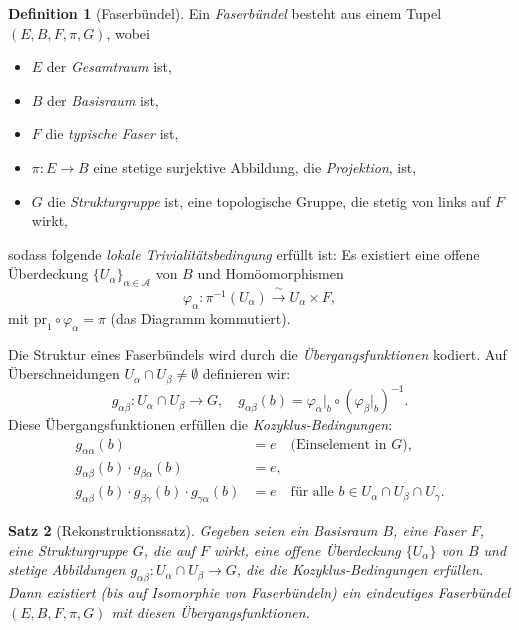 \documentclass[12pt,a4paper]{amsart}
\newtheorem{theorem}{Satz}[section]
\theoremstyle{definition}
\newtheorem{definition}[theorem]{Definition}
\begin{document}
\begin{definition}[Faserbündel]
Ein \emph{Faserbündel} besteht aus einem Tupel $(E, B, F, \pi, G)$, wobei
\begin{itemize}[noitemsep]
  \item $E$ der \emph{Gesamtraum} ist,
  \item $B$ der \emph{Basisraum} ist,
  \item $F$ die \emph{typische Faser} ist,
  \item $\pi \colon E \to B$ eine stetige surjektive Abbildung, die
        \emph{Projektion}, ist,
  \item $G$ die \emph{Strukturgruppe} ist, eine topologische Gruppe, die
        stetig von links auf $F$ wirkt,
\end{itemize}
sodass folgende \emph{lokale Trivialitätsbedingung} erfüllt ist: Es existiert
eine offene Überdeckung $\{U_\alpha\}_{\alpha \in \mathcal{A}}$ von $B$ und
Homöomorphismen
\[
  \varphi_\alpha \colon \pi^{-1}(U_\alpha) \xrightarrow{\;\sim\;} U_\alpha \times F,
\]
mit $\mathrm{pr}_1 \circ \varphi_\alpha = \pi$ (das Diagramm kommutiert).
\end{definition}

Die Struktur eines Faserbündels wird durch die \emph{Übergangsfunktionen} kodiert.
Auf Überschneidungen $U_\alpha \cap U_\beta \neq \emptyset$ definieren wir:
\[
  g_{\alpha\beta} \colon U_\alpha \cap U_\beta \to G, \quad
  g_{\alpha\beta}(b) = \varphi_\alpha|_b \circ (\varphi_\beta|_b)^{-1}.
\]
Diese Übergangsfunktionen erfüllen die \emph{Kozyklus-Bedingungen}:
\begin{align*}
  g_{\alpha\alpha}(b) &= e \quad \text{(Einselement in } G\text{)},\\
  g_{\alpha\beta}(b) \cdot g_{\beta\alpha}(b) &= e,\\
  g_{\alpha\beta}(b) \cdot g_{\beta\gamma}(b) \cdot g_{\gamma\alpha}(b) &= e
  \quad \text{für alle } b \in U_\alpha \cap U_\beta \cap U_\gamma.
\end{align*}

\begin{theorem}[Rekonstruktionssatz]
\label{thm:rekonstruktion}
Gegeben seien ein Basisraum $B$, eine Faser $F$, eine Strukturgruppe $G$, die
auf $F$ wirkt, eine offene Überdeckung $\{U_\alpha\}$ von $B$ und stetige
Abbildungen $g_{\alpha\beta} \colon U_\alpha \cap U_\beta \to G$, die die
Kozyklus-Bedingungen erfüllen. Dann existiert (bis auf Isomorphie von
Faserbündeln) ein eindeutiges Faserbündel $(E, B, F, \pi, G)$ mit diesen
Übergangsfunktionen.
\end{theorem}
\end{document}
